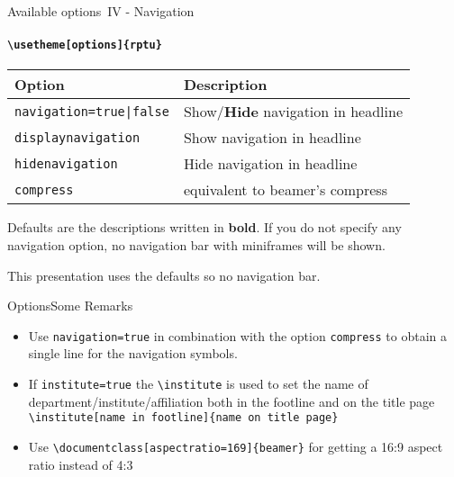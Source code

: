 \documentclass[aspectratio=169]{beamer}
\begin{document}
\begin{frame}{Available options~IV - Navigation}
	\framesubtitle{\texttt{\textbackslash usetheme[options]\{rptu\}}}
	\begin{tabular}{ll}
		\textbf{Option} & \textbf{Description}\\ \toprule
		\texttt{navigation=true|false} &Show/\textbf{Hide} navigation in headline \\
		\texttt{displaynavigation} & Show navigation in headline \\ 
		\texttt{hidenavigation} & Hide navigation in headline \\  \midrule
		\texttt{compress} & equivalent to beamer's compress \\\bottomrule
	\end{tabular}
	\vspace*{2ex}
	
	Defaults are the descriptions written in \textbf{bold}. If you do not specify any navigation option, no navigation bar with miniframes will be shown.
	
	This presentation uses the defaults so no navigation bar.
\end{frame}


\begin{frame}{Options}{Some Remarks}
	\begin{itemize}
		\item Use \texttt{navigation=true} in combination with the option \texttt{compress} to obtain a single line for the navigation symbols.
		\item If \texttt{institute=true} the \texttt{\textbackslash institute} is used to set the name of department/institute/affiliation both in the footline and on the title page\\
		\texttt{\textbackslash institute[name in footline]\{name on title page\}}
		\item Use \texttt{\textbackslash documentclass[aspectratio=169]\{beamer\}} for getting a 16:9 aspect ratio instead of 4:3
	\end{itemize}
\end{frame}

\rptuthankyou %
\end{document}
